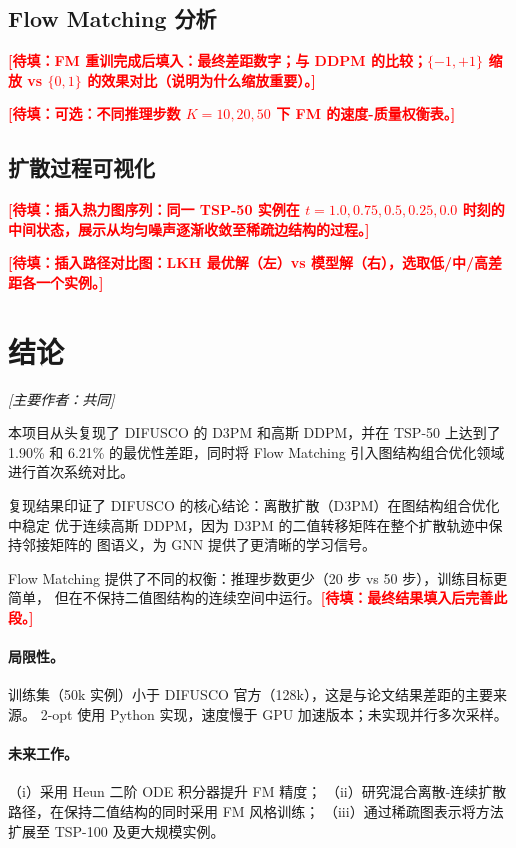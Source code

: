 \documentclass[11pt,a4paper]{article}
\newcommand{\TODO}[1]{\textcolor{red}{\textbf{[待填：#1]}}}
\begin{document}
\subsection{Flow Matching 分析}
\label{sec:fm_analysis_zh}
\TODO{FM 重训完成后填入：最终差距数字；与 DDPM 的比较；$\{-1,+1\}$ 缩放 vs $\{0,1\}$
的效果对比（说明为什么缩放重要）。}

\TODO{可选：不同推理步数 $K=10,20,50$ 下 FM 的速度-质量权衡表。}

\subsection{扩散过程可视化}
\TODO{插入热力图序列：同一 TSP-50 实例在 $t=1.0, 0.75, 0.5, 0.25, 0.0$ 时刻的
中间状态，展示从均匀噪声逐渐收敛至稀疏边结构的过程。}

\TODO{插入路径对比图：LKH 最优解（左）vs 模型解（右），选取低/中/高差距各一个实例。}


\section{结论}
\label{sec:conclusion}
\textit{[主要作者：共同]}

本项目从头复现了 DIFUSCO 的 D3PM 和高斯 DDPM，并在 TSP-50 上达到了 1.90\% 和
6.21\% 的最优性差距，同时将 Flow Matching 引入图结构组合优化领域进行首次系统对比。

复现结果印证了 DIFUSCO 的核心结论：离散扩散（D3PM）在图结构组合优化中稳定
优于连续高斯 DDPM，因为 D3PM 的二值转移矩阵在整个扩散轨迹中保持邻接矩阵的
图语义，为 GNN 提供了更清晰的学习信号。

Flow Matching 提供了不同的权衡：推理步数更少（20 步 vs 50 步），训练目标更简单，
但在不保持二值图结构的连续空间中运行。\TODO{最终结果填入后完善此段。}

\paragraph{局限性。}
训练集（50k 实例）小于 DIFUSCO 官方（128k），这是与论文结果差距的主要来源。
2-opt 使用 Python 实现，速度慢于 GPU 加速版本；未实现并行多次采样。

\paragraph{未来工作。}
（i）采用 Heun 二阶 ODE 积分器提升 FM 精度；
（ii）研究混合离散-连续扩散路径，在保持二值结构的同时采用 FM 风格训练；
（iii）通过稀疏图表示将方法扩展至 TSP-100 及更大规模实例。
\end{document}
